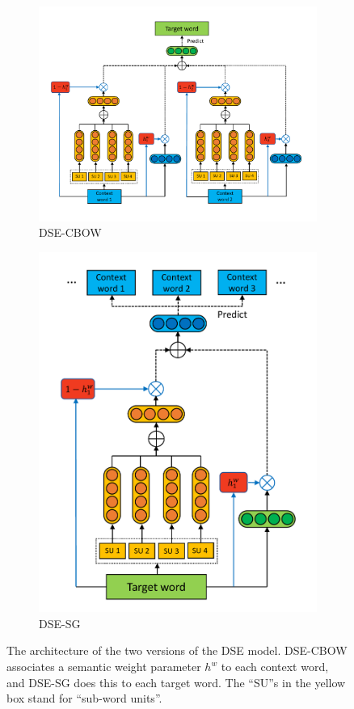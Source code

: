 \documentclass[output=paper]{langsci/langscibook}
\begin{document}
\begin{figure}[h]
\centering
\begin{subfigure}{0.66\linewidth}
	\includegraphics[width=\textwidth]{figures/XU_DSE-CBOW_subword.pdf}
	\caption{DSE-CBOW}
\end{subfigure}
\begin{subfigure}{0.33\linewidth}
	\includegraphics[width=\textwidth]{figures/XU_DSE-SG_subword.pdf}
	\caption{DSE-SG}
\end{subfigure}
\caption{The architecture of the two versions of the DSE model. DSE-CBOW associates a semantic weight parameter $h^w$ to each context word, and DSE-SG does this to each target word. The ``SU''s  in the yellow box stand for ``sub-word units''.}\label{fig:DSE}
\end{figure}
\end{document}
